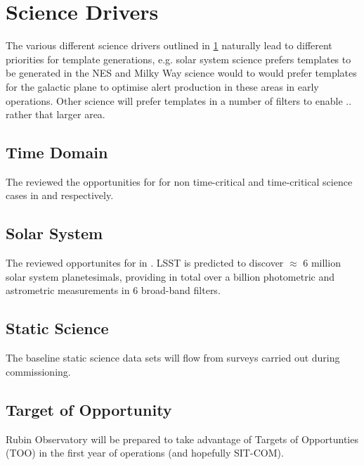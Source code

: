 \section{Science Drivers} \label{sec:science}

The various different science drivers outlined in \ref{sec:science} naturally lead to different priorities for template generations, e.g. solar system science prefers templates to be generated in the NES and Milky Way science would to would prefer templates for the galactic plane to optimise alert production in these areas in early operations. Other science will prefer templates in a number of filters to enable .. rather that larger area. 

\subsection{Time Domain}

The \tvssc reviewed the opportunities for \es for non time-critical and  time-critical science cases in \cite{Hambleton_2020} and \cite{Street_2020} respectively. 

\subsection{Solar System}

The \sssc reviewed opportunites for \es in . 
LSST is predicted to discover $\approx$ 6 million solar system planetesimals, providing in total over a billion photometric and astrometric measurements in 6 broad-band filters. 

\subsection{Static Science}
The baseline static science data sets will flow from \sv surveys carried out during commissioning. 

\subsection{Target of Opportunity}
Rubin Observatory will be prepared to take advantage of Targets of Opportunties (TOO) in the first year of operations (and hopefully SIT-COM). 